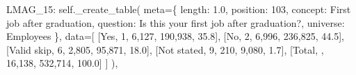 \documentclass[
  11pt,
  a4paper,
]{article}
\newenvironment{Shaded}{\begin{snugshade}}{\end{snugshade}}
\newcommand{\NormalTok}[1]{\textcolor[rgb]{0.00,0.23,0.31}{#1}}
\newcommand{\OperatorTok}[1]{\textcolor[rgb]{0.37,0.37,0.37}{#1}}
\newcommand{\StringTok}[1]{\textcolor[rgb]{0.13,0.47,0.30}{#1}}
\newcommand{\VariableTok}[1]{\textcolor[rgb]{0.07,0.07,0.07}{#1}}
\begin{document}
\begin{Shaded}
\begin{Highlighting}[]
    \StringTok{\textquotesingle{}LMAG\_15\textquotesingle{}}\NormalTok{: }\VariableTok{self}\NormalTok{.\_create\_table(}
\NormalTok{        meta}\OperatorTok{=}\NormalTok{\{}
            \StringTok{\textquotesingle{}length\textquotesingle{}}\NormalTok{: }\StringTok{\textquotesingle{}1.0\textquotesingle{}}\NormalTok{, }\StringTok{\textquotesingle{}position\textquotesingle{}}\NormalTok{: }\StringTok{\textquotesingle{}103\textquotesingle{}}\NormalTok{,}
            \StringTok{\textquotesingle{}concept\textquotesingle{}}\NormalTok{: }\StringTok{\textquotesingle{}First job after graduation\textquotesingle{}}\NormalTok{,}
            \StringTok{\textquotesingle{}question\textquotesingle{}}\NormalTok{: }\StringTok{\textquotesingle{}Is this your first job after graduation?\textquotesingle{}}\NormalTok{,}
            \StringTok{\textquotesingle{}universe\textquotesingle{}}\NormalTok{: }\StringTok{\textquotesingle{}Employees\textquotesingle{}}
\NormalTok{        \},}
\NormalTok{        data}\OperatorTok{=}\NormalTok{[}
\NormalTok{            [}\StringTok{\textquotesingle{}Yes\textquotesingle{}}\NormalTok{, }\StringTok{\textquotesingle{}1\textquotesingle{}}\NormalTok{, }\StringTok{\textquotesingle{}6,127\textquotesingle{}}\NormalTok{, }\StringTok{\textquotesingle{}190,938\textquotesingle{}}\NormalTok{, }\StringTok{\textquotesingle{}35.8\textquotesingle{}}\NormalTok{],}
\NormalTok{            [}\StringTok{\textquotesingle{}No\textquotesingle{}}\NormalTok{, }\StringTok{\textquotesingle{}2\textquotesingle{}}\NormalTok{, }\StringTok{\textquotesingle{}6,996\textquotesingle{}}\NormalTok{, }\StringTok{\textquotesingle{}236,825\textquotesingle{}}\NormalTok{, }\StringTok{\textquotesingle{}44.5\textquotesingle{}}\NormalTok{],}
\NormalTok{            [}\StringTok{\textquotesingle{}Valid skip\textquotesingle{}}\NormalTok{, }\StringTok{\textquotesingle{}6\textquotesingle{}}\NormalTok{, }\StringTok{\textquotesingle{}2,805\textquotesingle{}}\NormalTok{, }\StringTok{\textquotesingle{}95,871\textquotesingle{}}\NormalTok{, }\StringTok{\textquotesingle{}18.0\textquotesingle{}}\NormalTok{],}
\NormalTok{            [}\StringTok{\textquotesingle{}Not stated\textquotesingle{}}\NormalTok{, }\StringTok{\textquotesingle{}9\textquotesingle{}}\NormalTok{, }\StringTok{\textquotesingle{}210\textquotesingle{}}\NormalTok{, }\StringTok{\textquotesingle{}9,080\textquotesingle{}}\NormalTok{, }\StringTok{\textquotesingle{}1.7\textquotesingle{}}\NormalTok{],}
\NormalTok{            [}\StringTok{\textquotesingle{}Total\textquotesingle{}}\NormalTok{, }\StringTok{\textquotesingle{}\textquotesingle{}}\NormalTok{, }\StringTok{\textquotesingle{}16,138\textquotesingle{}}\NormalTok{, }\StringTok{\textquotesingle{}532,714\textquotesingle{}}\NormalTok{, }\StringTok{\textquotesingle{}100.0\textquotesingle{}}\NormalTok{]}
\NormalTok{        ]}
\NormalTok{    ),}


\end{Highlighting}
\end{Shaded}
\end{document}

